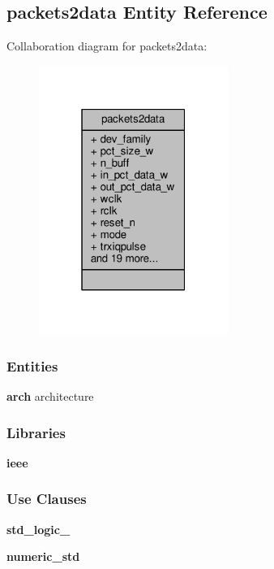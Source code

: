 \subsection{packets2data Entity Reference}
\label{classpackets2data}


Collaboration diagram for packets2data\+:\nopagebreak
\begin{figure}[H]
\begin{center}
\leavevmode
\includegraphics[width=175pt]{d1/d26/classpackets2data__coll__graph}
\end{center}
\end{figure}
\subsubsection*{Entities}
\begin{DoxyCompactItemize}
\item 
{\bf arch} architecture
\end{DoxyCompactItemize}
\subsubsection*{Libraries}
 \begin{DoxyCompactItemize}
\item 
{\bf ieee} 
\end{DoxyCompactItemize}
\subsubsection*{Use Clauses}
 \begin{DoxyCompactItemize}
\item 
{\bf std\+\_\+logic\+\_}   
\item 
{\bf numeric\+\_\+std}   
\end{DoxyCompactItemize}
